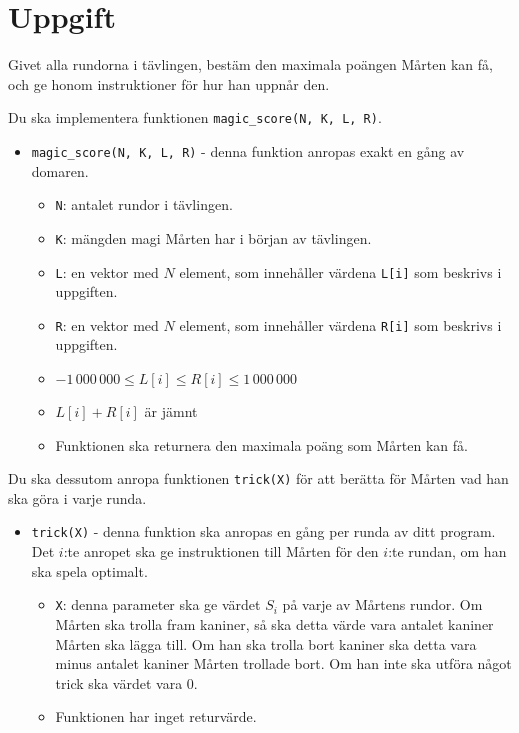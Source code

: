 \section*{Uppgift}
Givet alla rundorna i tävlingen, bestäm den maximala poängen Mårten kan få, och
ge honom instruktioner för hur han uppnår den.

Du ska implementera funktionen \texttt{magic\_score(N, K, L, R)}.
\begin{itemize}
  \item \texttt{magic\_score(N, K, L, R)} - denna funktion anropas exakt en gång av domaren.
  \begin{itemize}
    \item \texttt{N}: antalet rundor i tävlingen.
    \item \texttt{K}: mängden magi Mårten har i början av tävlingen.
    \item \texttt{L}: en vektor med $N$ element, som innehåller värdena \texttt{L[i]} som beskrivs i uppgiften.
    \item \texttt{R}: en vektor med $N$ element, som innehåller värdena \texttt{R[i]} som beskrivs i uppgiften.
    \item $-1\,000\,000 \le L[i] \le R[i] \le 1\,000\,000$
    \item $L[i] + R[i]$ är jämnt
    \item Funktionen ska returnera den maximala poäng som Mårten kan få.
  \end{itemize}

\end{itemize}

Du ska dessutom anropa funktionen \texttt{trick(X)} för att berätta för Mårten vad han ska göra i varje runda.
\begin{itemize}
  \item \texttt{trick(X)} - denna funktion ska anropas en gång per runda av ditt program.
    Det $i$:te anropet ska ge instruktionen till Mårten för den $i$:te rundan, om han ska spela optimalt.
  \begin{itemize}
    \item \texttt{X}: denna parameter ska ge värdet $S_i$ på varje av Mårtens rundor.
      Om Mårten ska trolla fram kaniner,
      så ska detta värde vara antalet kaniner Mårten ska lägga till. Om han ska trolla bort kaniner ska detta vara minus antalet kaniner Mårten trollade bort. 
      Om han inte ska utföra något trick ska värdet vara $0$.
    \item Funktionen har inget returvärde.
  \end{itemize}
\end{itemize}


